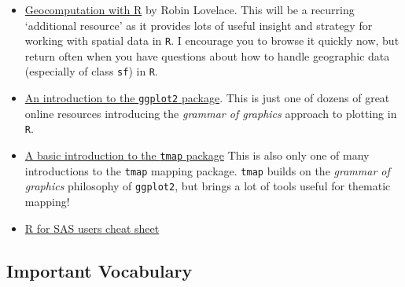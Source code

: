 \documentclass[
]{book}
\providecommand{\tightlist}{%
  \setlength{\itemsep}{0pt}\setlength{\parskip}{0pt}}
\begin{document}
\begin{itemize}
\tightlist
\item
  \href{https://geocompr.robinlovelace.net/}{Geocomputation with R} by Robin Lovelace. This will be a recurring `additional resource' as it provides lots of useful insight and strategy for working with spatial data in \texttt{R}. I encourage you to browse it quickly now, but return often when you have questions about how to handle geographic data (especially of class \texttt{sf}) in \texttt{R}.
\item
  \href{https://ggplot2-book.org/introduction.html}{An introduction to the \texttt{ggplot2} package}. This is just one of dozens of great online resources introducing the \emph{grammar of graphics} approach to plotting in \texttt{R}.
\item
  \href{https://tlorusso.github.io/geodata_workshop/tmap_package\#:~:text=The\%20tmap\%20package\%20is\%20a,as\%20choropleths\%20and\%20bubble\%20maps.}{A basic introduction to the \texttt{tmap} package} This is also only one of many introductions to the \texttt{tmap} mapping package. \texttt{tmap} builds on the \emph{grammar of graphics} philosophy of \texttt{ggplot2}, but brings a lot of tools useful for thematic mapping!
\item
  \href{https://raw.githubusercontent.com/rstudio/cheatsheets/main/sas-r.pdf}{R for SAS users cheat sheet}
\end{itemize}

\hypertarget{important-vocabulary}{%
\subsection{Important Vocabulary}\label{important-vocabulary}}

 
  \providecommand{\huxb}[2]{\arrayrulecolor[RGB]{#1}\global\arrayrulewidth=#2pt}
  \providecommand{\huxvb}[2]{\color[RGB]{#1}\vrule width #2pt}
  \providecommand{\huxtpad}[1]{\rule{0pt}{#1}}
  \providecommand{\huxbpad}[1]{\rule[-#1]{0pt}{#1}}
\end{document}

